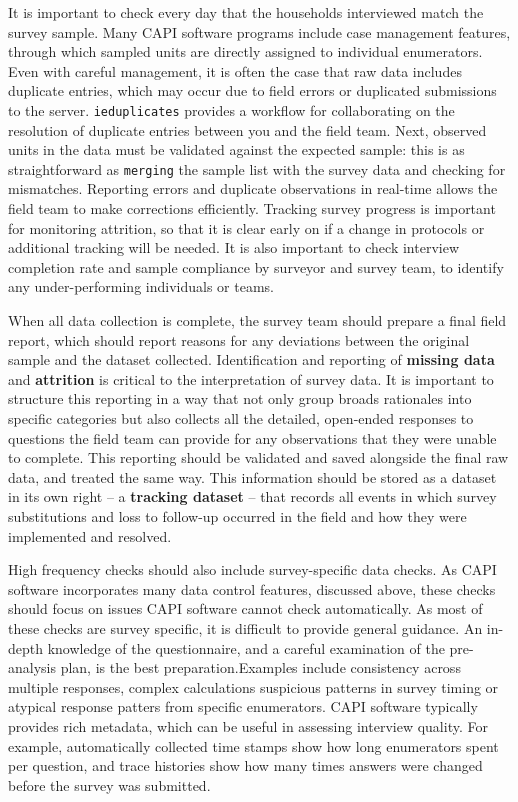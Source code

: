 {It is important to check every day that the households interviewed match the survey sample. 
Many CAPI software programs include case management features, through which sampled units are directly assigned to individual enumerators. 
Even with careful management, it is often the case that raw data includes duplicate entries, which may occur due to field errors or duplicated submissions to the server. 
\texttt{ieduplicates}
provides a workflow for collaborating on the resolution of duplicate entries between you and the field team.
Next, observed units in the data must be validated against the expected sample:
this is as straightforward as \texttt{merging} the sample list with the survey data and checking for mismatches.
Reporting errors and duplicate observations in real-time allows the field team to make corrections efficiently.
Tracking survey progress is important for monitoring attrition, so that it is clear early on if a change in protocols or additional tracking will be needed. 
It is also important to check interview completion rate and sample compliance by surveyor and survey team, to identify any under-performing individuals or teams. 

When all data collection is complete, the survey team should prepare a final field report, which should report reasons for any deviations between the original sample and the dataset collected.
Identification and reporting of \textbf{missing data} and \textbf{attrition} is critical to the interpretation of survey data.
It is important to structure this reporting in a way that not only group broads rationales into specific categories
but also collects all the detailed, open-ended responses to questions the field team can provide for any observations that they were unable to complete.
This reporting should be validated and saved alongside the final raw data, and treated the same way.
This information should be stored as a dataset in its own right -- a \textbf{tracking dataset} -- that records all events in which survey substitutions
and loss to follow-up occurred in the field and how they were implemented and resolved.

High frequency checks should also include survey-specific data checks. As CAPI software incorporates many data control features, discussed above, these checks should focus on issues CAPI software cannot check automatically. As most of these checks are survey specific, it is difficult to provide general guidance. An in-depth knowledge of the questionnaire, and a careful examination of the pre-analysis plan, is the best preparation.Examples include  consistency across multiple responses, complex calculations suspicious patterns in survey timing or atypical response patters from specific enumerators.  CAPI software typically provides rich metadata, which can be useful in assessing interview quality. For example, automatically collected time stamps show how long enumerators spent per question, and trace histories show how many times answers were changed before the survey was submitted. 


}
